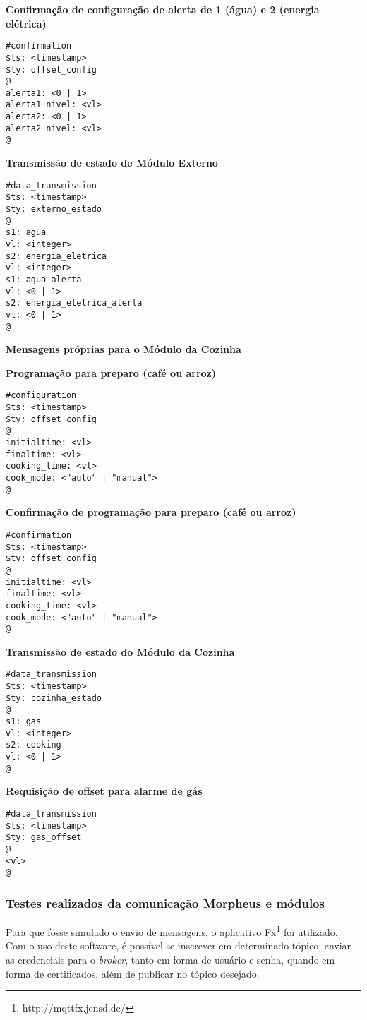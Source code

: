 \textbf{Confirmação de configuração de alerta de 1 (água) e 2 (energia elétrica)}
\begin{lstlisting}
#confirmation
$ts: <timestamp>
$ty: offset_config
@
alerta1: <0 | 1>
alerta1_nivel: <vl>
alerta2: <0 | 1>
alerta2_nivel: <vl>
@
\end{lstlisting}

\textbf{Transmissão de estado de Módulo Externo}
\begin{lstlisting}
#data_transmission
$ts: <timestamp>
$ty: externo_estado
@
s1: agua
vl: <integer>
s2: energia_eletrica
vl: <integer>
s1: agua_alerta
vl: <0 | 1>
s2: energia_eletrica_alerta
vl: <0 | 1>
@
\end{lstlisting}

\textbf{Mensagens próprias para o Módulo da Cozinha}

\textbf{Programação para preparo (café ou arroz)}
\begin{lstlisting}
#configuration
$ts: <timestamp>
$ty: offset_config
@
initialtime: <vl>
finaltime: <vl>
cooking_time: <vl>
cook_mode: <"auto" | "manual">
@
\end{lstlisting}

\textbf{Confirmação de programação para preparo (café ou arroz)}
\begin{lstlisting}
#confirmation
$ts: <timestamp>
$ty: offset_config
@
initialtime: <vl>
finaltime: <vl>
cooking_time: <vl>
cook_mode: <"auto" | "manual">
@
\end{lstlisting}

\textbf{Transmissão de estado do Módulo da Cozinha}
\begin{lstlisting}
#data_transmission
$ts: <timestamp>
$ty: cozinha_estado
@
s1: gas
vl: <integer>
s2: cooking
vl: <0 | 1>
@
\end{lstlisting}

\textbf{Requisição de offset para alarme de gás}
\begin{lstlisting}
#data_transmission
$ts: <timestamp>
$ty: gas_offset
@
<vl>
@
\end{lstlisting}

\subsubsection{Testes realizados da comunicação Morpheus e módulos}

Para que fosse simulado o envio de mensagens, o aplicativo \wmqtt{} Fx\footnote{http://mqttfx.jensd.de/} foi utilizado. Com o uso deste software, é possível se inscrever em determinado tópico, enviar as credenciais para o \emph{broker}, tanto em forma de usuário e senha, quando em forma de certificados, além de publicar no tópico desejado.

